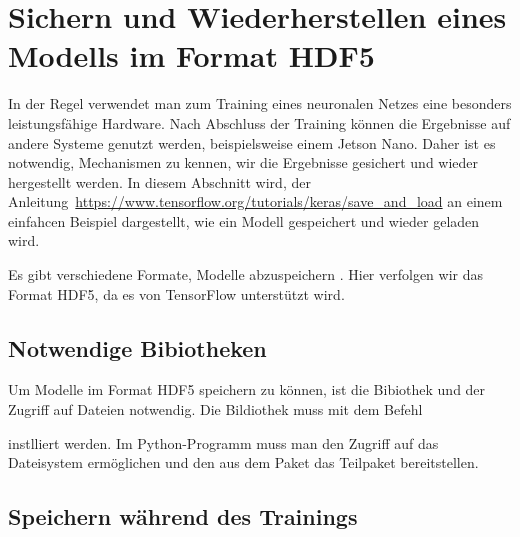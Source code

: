 

\section{Sichern und Wiederherstellen eines Modells im Format HDF5}


In der Regel verwendet man zum Training eines neuronalen Netzes eine besonders leistungsfähige Hardware. Nach Abschluss der Training können die Ergebnisse auf andere Systeme genutzt werden, beispielsweise einem Jetson Nano. Daher ist es notwendig, Mechanismen zu kennen, wir die Ergebnisse gesichert und wieder hergestellt werden. In diesem Abschnitt wird, der Anleitung~\url{https://www.tensorflow.org/tutorials/keras/save_and_load}  an einem einfahcen Beispiel dargestellt, wie ein Modell gespeichert und wieder geladen wird. \cite{GoogleTensorFlow:2019,StackOverflow:2019}

Es gibt verschiedene Formate, Modelle abzuspeichern \cite{Onnx:2021,Junjie:2019,Folk:2011,HDF5} . Hier verfolgen wir das Format HDF5, da es von TensorFlow unterstützt wird.  

\subsection{Notwendige Bibiotheken}

Um Modelle im Format HDF5 speichern zu können, ist die Bibiothek  und der Zugriff auf Dateien notwendig. Die Bildiothek muss mit dem Befehl

\medskip


\medskip

instlliert werden. Im Python-Programm muss man den Zugriff auf das Dateisystem ermöglichen und den aus dem Paket  das Teilpaket  bereitstellen.

\medskip




\medskip


\subsection{Speichern während des Trainings}

